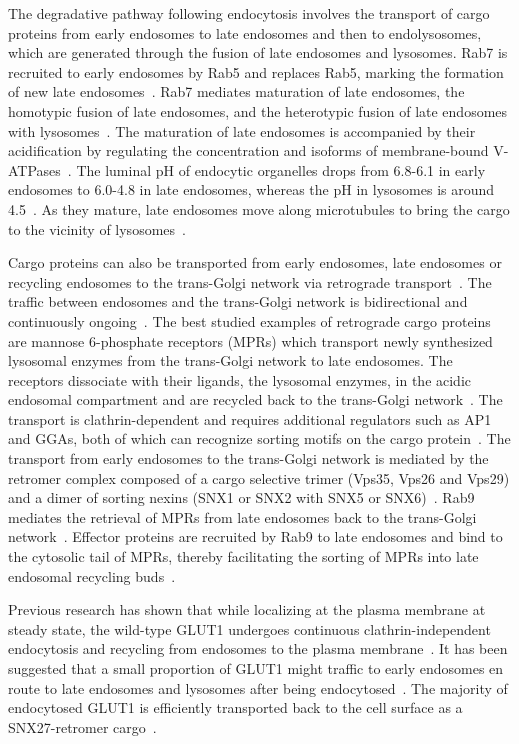 The degradative pathway following endocytosis involves the transport of cargo proteins from early endosomes to late endosomes and then to endolysosomes, which are generated through the fusion of late endosomes and lysosomes. Rab7 is recruited to early endosomes by Rab5 and replaces Rab5, marking the formation of new late endosomes~\cite{Huotari}. Rab7 mediates maturation of late endosomes, the homotypic fusion of late endosomes, and the heterotypic fusion of late endosomes with lysosomes~\cite{Stenmark}. The maturation of late endosomes is accompanied by their acidification by regulating the concentration and isoforms of membrane-bound V-ATPases~\cite{Huotari}. The luminal pH of endocytic organelles drops from 6.8-6.1 in early endosomes to 6.0-4.8 in late endosomes, whereas the pH in lysosomes is around 4.5~\cite{Maxfield}. As they mature, late endosomes move along microtubules to bring the cargo to the vicinity of lysosomes~\cite{Huotari}.

Cargo proteins can also be transported from early endosomes, late endosomes or recycling endosomes to the trans-Golgi network via retrograde transport~\cite{Huotari,Johannes}. The traffic between endosomes and the trans-Golgi network is bidirectional and continuously ongoing~\cite{Huotari}. The best studied examples of retrograde cargo proteins are mannose 6-phosphate receptors (MPRs) which transport newly synthesized lysosomal enzymes from the trans-Golgi network to late endosomes. The receptors dissociate with their ligands, the lysosomal enzymes, in the acidic endosomal compartment and are recycled back to the trans-Golgi network~\cite{Progida}. The transport is clathrin-dependent and requires additional regulators such as AP1 and GGAs, both of which can recognize sorting motifs on the cargo protein~\cite{Klinger}. The transport from early endosomes to the trans-Golgi network is mediated by the retromer complex composed of a cargo selective trimer (Vps35, Vps26 and Vps29) and a dimer of sorting nexins (SNX1 or SNX2 with SNX5 or SNX6)~\cite{Johannes,Seaman}. Rab9 mediates the retrieval of MPRs from late endosomes back to the trans-Golgi network~\cite{Stenmark}. Effector proteins are recruited by Rab9 to late endosomes and bind to the cytosolic tail of MPRs, thereby facilitating the sorting of MPRs into late endosomal recycling buds~\cite{Stenmark}. 

Previous research has shown that while localizing at the plasma membrane at steady state, the wild-type GLUT1 undergoes continuous clathrin-independent endocytosis and recycling from endosomes to the plasma membrane~\cite{Eyster,McGough}. It has been suggested that a small proportion of GLUT1 might traffic to early endosomes en route to late endosomes and lysosomes after being endocytosed~\cite{Eyster,McGough}. The majority of endocytosed GLUT1 is efficiently transported back to the cell surface as a SNX27-retromer cargo~\cite{Steinberg}.
\newcommand{\keyword}[1]{\textbf{#1}}
\newcommand{\tabhead}[1]{\textbf{#1}}
\newcommand{\code}[1]{\texttt{#1}}
\newcommand{\file}[1]{\texttt{\bfseries#1}}
\newcommand{\option}[1]{\texttt{\itshape#1}}
